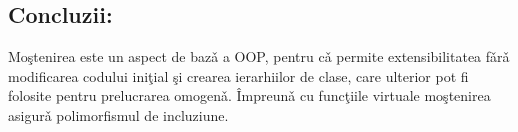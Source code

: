 \subsection{Concluzii:}
Mo\c{s}tenirea este un aspect de baz\v{a} a OOP, pentru c\v{a} permite extensibilitatea
f\v{a}r\v{a} modificarea codului ini\c{t}ial \c{s}i crearea ierarhiilor de clase, care 
ulterior pot fi folosite pentru prelucrarea omogen\v{a}. \^{I}mpreun\v{a} cu func\c{t}iile
virtuale mo\c{s}tenirea asigur\v{a} polimorfismul de incluziune.

